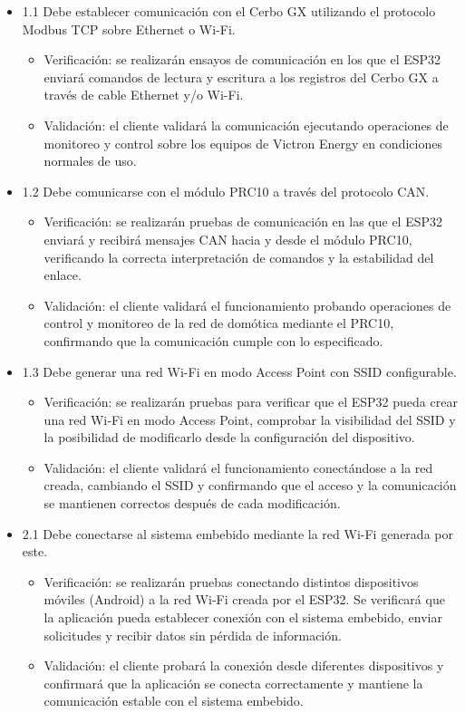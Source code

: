 \documentclass[
11pt, %
]{charter}
\begin{document}
\begin{itemize} 
\item 1.1 Debe establecer comunicación con el Cerbo GX utilizando el protocolo Modbus TCP sobre Ethernet o Wi-Fi.

\begin{itemize}
	\item Verificación: se realizarán ensayos de comunicación en los que el ESP32 enviará comandos de lectura y escritura a los registros del Cerbo GX a través de cable Ethernet y/o Wi-Fi.
	\item Validación: el cliente validará la comunicación ejecutando operaciones de monitoreo y control sobre los equipos de Victron Energy en condiciones normales de uso. 
\end{itemize}

\item 1.2 Debe comunicarse con el módulo PRC10 a través del protocolo CAN.

\begin{itemize}
	\item Verificación: se realizarán pruebas de comunicación en las que el ESP32 enviará y recibirá mensajes CAN hacia y desde el módulo PRC10, verificando la correcta interpretación de comandos y la estabilidad del enlace.
	\item Validación: el cliente validará el funcionamiento probando operaciones de control y monitoreo de la red de domótica mediante el PRC10, confirmando que la comunicación cumple con lo especificado.
\end{itemize}

\item 1.3 Debe generar una red Wi-Fi en modo Access Point con SSID configurable.

\begin{itemize}
	\item Verificación: se realizarán pruebas para verificar que el ESP32 pueda crear una red Wi‑Fi en modo Access Point, comprobar la visibilidad del SSID y la posibilidad de modificarlo desde la configuración del dispositivo.
	\item Validación: el cliente validará el funcionamiento conectándose a la red creada, cambiando el SSID y confirmando que el acceso y la comunicación se mantienen correctos después de cada modificación.
\end{itemize}

\item 2.1 Debe conectarse al sistema embebido mediante la red Wi-Fi generada por este.
\begin{itemize}
	\item Verificación: se realizarán pruebas conectando distintos dispositivos móviles (Android) a la red Wi‑Fi creada por el ESP32. Se verificará que la aplicación pueda establecer conexión con el sistema embebido, enviar solicitudes y recibir datos sin pérdida de información.
	\item  Validación: el cliente probará la conexión desde diferentes dispositivos y confirmará que la aplicación se conecta correctamente y mantiene la comunicación estable con el sistema embebido.
\end{itemize}


\end{itemize}
\end{document}
